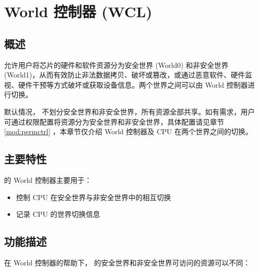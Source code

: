 \documentclass[main\_\_CN.tex]{subfiles}
\begin{document}

\ifglobal
\else
    {\let\clearpage\relax \listoftodos}
    {\let\clearpage\relax \listofdonetodos}
    \tableofcontents
\fi


\hypertarget{wctrl}{}
\chapter{World 控制器 (WCL)}\label{mod:wctrl}

\section{概述}

\chipname{} 允许用户将芯片的硬件和软件资源分为安全世界 (World0) 和非安全世界 (World1)，从而有效防止非法数据拷贝、破坏或篡改，或通过恶意软件、硬件监视、硬件干预等方式破坏或获取设备信息。两个世界之间可以由 World 控制器进行切换。

默认情况，\chipname{} 不划分安全世界和非安全世界，所有资源全部共享。如有需求，用户可通过权限配置将资源分为安全世界和非安全世界，具体配置请见章节 \ref{mod:permctrl} \textit{}，本章节仅介绍 World 控制器及 CPU 在两个世界之间的切换。

\section{主要特性}
\label{sec:alias-features}

\chipname{} 的 World 控制器主要用于：
\begin{itemize}
    \item 控制 CPU 在安全世界与非安全世界中的相互切换
    \item 记录 CPU 的世界切换信息
\end{itemize}

\section{功能描述}
\label{sec:34-WCTRL-func-descr}

在 World 控制器的帮助下，\chipname{} 的安全世界和非安全世界可访问的资源可以不同：
\end{document}
